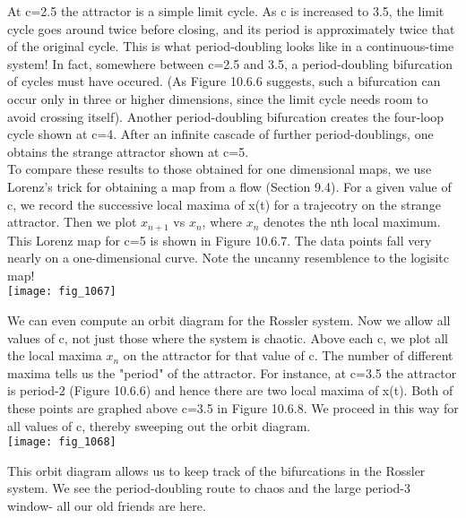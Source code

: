 \documentclass{article}
\newcommand\tab[1][1cm]{\hspace*{#1}}
\begin{document}
At c=2.5 the attractor is a simple limit cycle. As c is increased to 3.5, the limit cycle goes around twice before closing, and its period is approximately twice that of the original cycle. This is what period-doubling looks like in a continuous-time system! In fact, somewhere between c=2.5 and 3.5, a period-doubling bifurcation of cycles must have occured. (As Figure 10.6.6 suggests, such a bifurcation can occur only in three or higher dimensions, since the limit cycle needs room to avoid crossing itself). Another period-doubling bifurcation creates the four-loop cycle shown at c=4. After an infinite cascade of further period-doublings, one obtains the strange attractor shown at c=5. \\ \tab
To compare these results to those obtained for one dimensional maps, we use Lorenz's trick for obtaining a map from a flow (Section 9.4). For a given value of c, we record the successive local maxima of x(t) for a trajecotry on the strange attractor. Then we plot $x_{n+1}$ vs $x_{n}$, where $x_{n}$ denotes the nth local maximum. This Lorenz map for c=5 is shown in Figure 10.6.7. The data points fall very nearly on a one-dimensional curve. Note the uncanny resemblence to the logisitc map! \\

\texttt{[image: fig\_1067]}

We can even compute an orbit diagram for the Rossler system. Now we allow all values of c, not just those where the system is chaotic. Above each c, we plot all the local maxima $x_{n}$ on the attractor for that value of c. The number of different maxima tells us the "period" of the attractor. For instance, at c=3.5 the attractor is period-2 (Figure 10.6.6) and hence there are two local maxima of x(t). Both of these points are graphed above c=3.5 in Figure 10.6.8. We proceed in this way for all values of c, thereby sweeping out the orbit diagram. \\

\texttt{[image: fig\_1068]}

This orbit diagram allows us to keep track of the bifurcations in the Rossler system. We see the period-doubling route to chaos and the large period-3 window- all our old friends are here. \\ \tab
\end{document}

